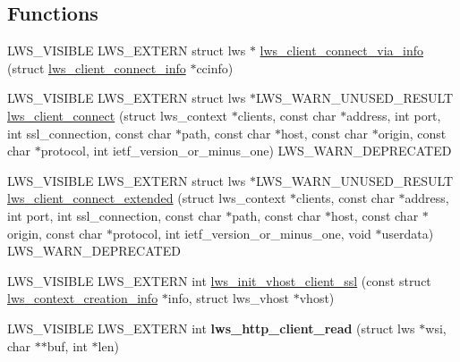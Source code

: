 \subsection*{Functions}
\begin{DoxyCompactItemize}
\item 
L\+W\+S\+\_\+\+V\+I\+S\+I\+B\+LE L\+W\+S\+\_\+\+E\+X\+T\+E\+RN struct lws $\ast$ \hyperlink{group__client_ga0c966136905f467816307cfba6deb5fd}{lws\+\_\+client\+\_\+connect\+\_\+via\+\_\+info} (struct \hyperlink{structlws__client__connect__info}{lws\+\_\+client\+\_\+connect\+\_\+info} $\ast$ccinfo)
\item 
L\+W\+S\+\_\+\+V\+I\+S\+I\+B\+LE L\+W\+S\+\_\+\+E\+X\+T\+E\+RN struct lws $\ast$L\+W\+S\+\_\+\+W\+A\+R\+N\+\_\+\+U\+N\+U\+S\+E\+D\+\_\+\+R\+E\+S\+U\+LT \hyperlink{group__client_ga4af0a20108a95e8b6d94dd4d80055ff3}{lws\+\_\+client\+\_\+connect} (struct lws\+\_\+context $\ast$clients, const char $\ast$address, int port, int ssl\+\_\+connection, const char $\ast$path, const char $\ast$host, const char $\ast$origin, const char $\ast$protocol, int ietf\+\_\+version\+\_\+or\+\_\+minus\+\_\+one) L\+W\+S\+\_\+\+W\+A\+R\+N\+\_\+\+D\+E\+P\+R\+E\+C\+A\+T\+ED
\item 
L\+W\+S\+\_\+\+V\+I\+S\+I\+B\+LE L\+W\+S\+\_\+\+E\+X\+T\+E\+RN struct lws $\ast$L\+W\+S\+\_\+\+W\+A\+R\+N\+\_\+\+U\+N\+U\+S\+E\+D\+\_\+\+R\+E\+S\+U\+LT \hyperlink{group__client_gac6a8558b4410961a880241c2ac1271e2}{lws\+\_\+client\+\_\+connect\+\_\+extended} (struct lws\+\_\+context $\ast$clients, const char $\ast$address, int port, int ssl\+\_\+connection, const char $\ast$path, const char $\ast$host, const char $\ast$origin, const char $\ast$protocol, int ietf\+\_\+version\+\_\+or\+\_\+minus\+\_\+one, void $\ast$userdata) L\+W\+S\+\_\+\+W\+A\+R\+N\+\_\+\+D\+E\+P\+R\+E\+C\+A\+T\+ED
\item 
L\+W\+S\+\_\+\+V\+I\+S\+I\+B\+LE L\+W\+S\+\_\+\+E\+X\+T\+E\+RN int \hyperlink{group__client_ga4f44b8230e6732816ca5cd8d1aaaf340}{lws\+\_\+init\+\_\+vhost\+\_\+client\+\_\+ssl} (const struct \hyperlink{structlws__context__creation__info}{lws\+\_\+context\+\_\+creation\+\_\+info} $\ast$info, struct lws\+\_\+vhost $\ast$vhost)
\item 
L\+W\+S\+\_\+\+V\+I\+S\+I\+B\+LE L\+W\+S\+\_\+\+E\+X\+T\+E\+RN int {\bfseries lws\+\_\+http\+\_\+client\+\_\+read} (struct lws $\ast$wsi, char $\ast$$\ast$buf, int $\ast$len)\hypertarget{group__client_ga4450c34200bf9dab3beb90ef23221870}{}\label{group__client_ga4450c34200bf9dab3beb90ef23221870}

\end{DoxyCompactItemize}


